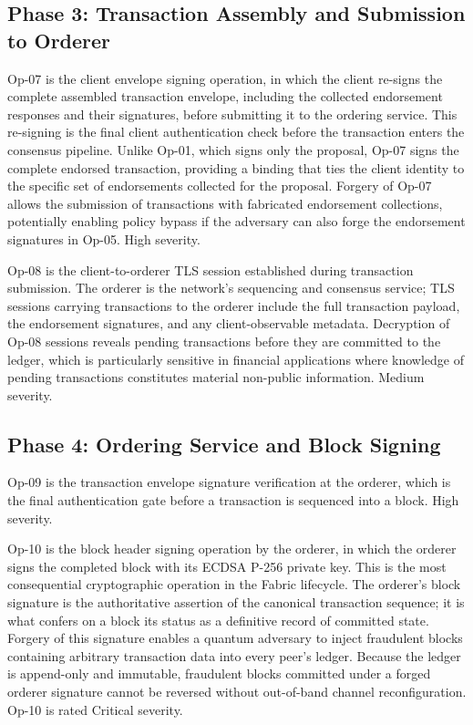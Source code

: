\documentclass[conference]{IEEEtran}
\begin{document}
\subsection{Phase 3: Transaction Assembly and Submission to Orderer}

Op-07 is the client envelope signing operation, in which the client
re-signs the complete assembled transaction envelope, including the
collected endorsement responses and their signatures, before submitting
it to the ordering service. This re-signing is the final client
authentication check before the transaction enters the consensus
pipeline. Unlike Op-01, which signs only the proposal, Op-07 signs the
complete endorsed transaction, providing a binding that ties the client
identity to the specific set of endorsements collected for the proposal.
Forgery of Op-07 allows the submission of transactions with fabricated
endorsement collections, potentially enabling policy bypass if the
adversary can also forge the endorsement signatures in Op-05. High severity.

Op-08 is the client-to-orderer TLS session established during transaction
submission. The orderer is the network's sequencing and consensus service;
TLS sessions carrying transactions to the orderer include the full
transaction payload, the endorsement signatures, and any client-observable
metadata. Decryption of Op-08 sessions reveals pending transactions before
they are committed to the ledger, which is particularly sensitive in
financial applications where knowledge of pending transactions constitutes
material non-public information. Medium severity.

\subsection{Phase 4: Ordering Service and Block Signing}

Op-09 is the transaction envelope signature verification at the orderer,
which is the final authentication gate before a transaction is sequenced
into a block. High severity.

Op-10 is the block header signing operation by the orderer, in which the
orderer signs the completed block with its ECDSA P-256 private key. This
is the most consequential cryptographic operation in the Fabric
lifecycle. The orderer's block signature is the authoritative assertion
of the canonical transaction sequence; it is what confers on a block its
status as a definitive record of committed state. Forgery of this
signature enables a quantum adversary to inject fraudulent blocks
containing arbitrary transaction data into every peer's ledger. Because
the ledger is append-only and immutable, fraudulent blocks committed
under a forged orderer signature cannot be reversed without out-of-band
channel reconfiguration. Op-10 is rated Critical severity.
\end{document}
